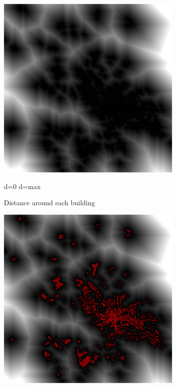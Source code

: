 \documentclass[10pt]{article}
\begin{document}
\begin{figure}[H]
\begin{subfigure}{0.49\textwidth}
        \includegraphics[width=.9\textwidth]{binary_2_dist}
        \caption{Distance around each building}
        {\vspace{3mm}
            \small\centering
            \quad d=0 
            \quad d=max
        }
    \end{subfigure}
    \begin{subfigure}{0.49\textwidth}
        \centering
        \includegraphics[width=.9\textwidth]{binary_3_bati-dist}

\end{subfigure}
\end{figure}
\end{document}
